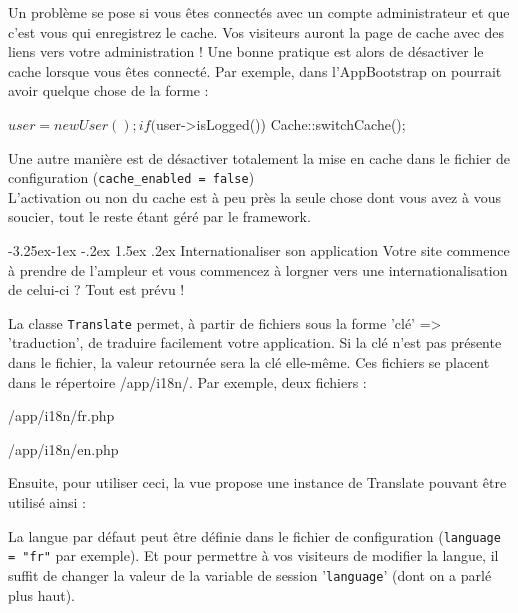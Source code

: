 \documentclass[a4paper,11pt]{article}
\makeatletter
\renewcommand{\subsection}{\@startsection{subsection}{2}{\z@}%
             {-3.25ex\@plus -1ex \@minus -.2ex}%
             {1.5ex \@plus .2ex}%
             {\color{bleuFonce}\normalfont\large\bfseries}}
\makeatother
\begin{document}
Un problème se pose si vous êtes connectés avec un compte administrateur et que c'est vous qui enregistrez le cache. Vos visiteurs auront la page de cache avec des liens vers votre administration ! Une bonne pratique est alors de désactiver le cache lorsque vous êtes connecté. Par exemple, dans l'AppBootstrap on pourrait avoir quelque chose de la forme :
\begin{PHP}
$user = new User();

if($user->isLogged()) {
  Cache::switchCache();
}
\end{PHP}

Une autre manière est de désactiver totalement la mise en cache dans le fichier de configuration (\texttt{cache\_enabled = false})\\

L'activation ou non du cache est à peu près la seule chose dont vous avez à vous soucier, tout le reste étant géré par le framework.

\subsection{Internationaliser son application}
Votre site commence à prendre de l'ampleur et vous commencez à lorgner vers une internationalisation de celui-ci ? Tout est prévu !

La classe \texttt{Translate} permet, à partir de fichiers sous la forme 'clé' => 'traduction', de traduire facilement votre application. Si la clé n'est pas présente dans le fichier, la valeur retournée sera la clé elle-même. Ces fichiers se placent dans le répertoire /app/i18n/. Par exemple, deux fichiers :

/app/i18n/fr.php
\begin{PHP}
return array(
  'home' => 'Accueil',
  'welcome' => 'Bienvenue !',
  'connection' => 'Connexion',
}
\end{PHP}

/app/i18n/en.php
\begin{PHP}
return array(
  'home' => 'Home',
  'welcome' => 'Welcome !',
  'connection' => 'Connection',
}
\end{PHP}

Ensuite, pour utiliser ceci, la vue propose une instance de Translate pouvant être utilisé ainsi :

La langue par défaut peut être définie dans le fichier de configuration (\texttt{language = "fr"} par exemple). Et pour permettre à vos visiteurs de modifier la langue, il suffit de changer la valeur de la variable de session '\texttt{language}' (dont on a parlé plus haut).
\end{document}

